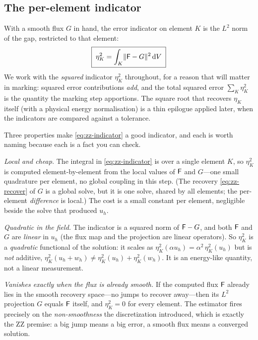 \subsection{The per-element indicator}

With a smooth flux $G$ in hand, the error indicator on element $K$ is the $L^2$ norm
of the gap, restricted to that element:
\begin{equation}
\boxed{\;
\eta_K^2 = \int_K \lVert\mathsf{F} - G\rVert^2 \,\mathrm{d}V
\;}
\label{eq:zz-indicator}
\end{equation}
We work with the \emph{squared} indicator $\eta_K^2$ throughout, for a reason that
will matter in marking: squared error contributions \emph{add}, and the total squared
error $\sum_K \eta_K^2$ is the quantity the marking step apportions. The square root
that recovers $\eta_K$ itself (with a physical energy normalisation) is a thin
epilogue applied later, when the indicators are compared against a tolerance.

Three properties make \cref{eq:zz-indicator} a good indicator, and each is worth
naming because each is a fact you can check.

\emph{Local and cheap.} The integral in \cref{eq:zz-indicator} is over a single
element $K$, so $\eta_K^2$ is computed element-by-element from the local values of
$\mathsf{F}$ and $G$---one small quadrature per element, no global coupling in this step.
(The recovery \cref{eq:zz-recover} of $G$ is a global solve, but it is one solve,
shared by all elements; the per-element \emph{difference} is local.) The cost is a
small constant per element, negligible beside the solve that produced $u_h$.

\emph{Quadratic in the field.} The indicator is a squared norm of $\mathsf{F} - G$, and
both $\mathsf{F}$ and $G$ are \emph{linear} in $u_h$ (the flux map and the projection are
linear operators). So $\eta_K^2$ is a \emph{quadratic} functional of the solution: it
scales as $\eta_K^2(\alpha u_h) = \alpha^2\,\eta_K^2(u_h)$ but is \emph{not} additive,
$\eta_K^2(u_h + w_h) \ne \eta_K^2(u_h) + \eta_K^2(w_h)$. It is an energy-like
quantity, not a linear measurement.

\emph{Vanishes exactly when the flux is already smooth.} If the computed flux $\mathsf{F}$ already lies in the smooth recovery space---no jumps to recover away---then its
$L^2$ projection $G$ equals $\mathsf{F}$ itself, and $\eta_K^2 = 0$ for every element.
The estimator fires precisely on the \emph{non-smoothness} the discretization
introduced, which is exactly the ZZ premise: a big jump means a big error, a smooth
flux means a converged solution.

